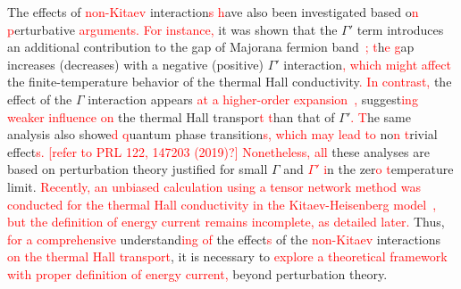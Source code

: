 \documentclass[twocolumn,superscriptaddress,showpacs, longbibliography, aps, prb]{revtex4-2}
\newcommand{\red}[1]{\textcolor{red}{#1}}
\begin{document}
The effects of %
\red{non-Kitaev} interaction\red{s %
h}ave also been investigated based o\red{n %
p}erturbative %
\red{arguments.} %
\red{For instance,} %
it was shown that the $\Gamma'$ term introduces 
an additional contribution to the gap of Majorana fermion band~\cite{TakikawaF2020}\red{; %
t}h\red{e %
g}ap %
increases (decreases)
with a negative (positive) $\Gamma'$ interaction\red{, which might affect} %
the finite-temperature behavior of the thermal Hall conductivity\red{.} %
\red{In contrast,} the 
effect of the $\Gamma$ interaction %
appears %
\red{at a higher-order expansion~\cite{YamadaF2021},}
suggest\red{ing} %
\red{weaker influence on} %
the thermal Hall transpor\red{t %
t}han that of $\Gamma'$\red{. %
T}he same analysis also showe\red{d %
q}uantum phase transition\red{s, %
which may lead to} 
no\red{n%
t}rivial effect\red{s.} %
\red{[refer to PRL 122, 147203 (2019)?]} 
\red{Nonetheless, all} these analyses are based on %
perturbation theory justified for small $\Gamma$ and \red{$\Gamma'$ %
i}n the zer\red{o %
t}emperature limit. 
\red{Recently, an unbiased calculation using a tensor network method was conducted for the thermal Hall conductivity in the Kitaev-Heisenberg model~\cite{KumarT2023}, but the definition of energy current remains incomplete, as detailed later.} 
Thus, %
\red{for a comprehensive} understand\red{ing of} the effect\red{s} of the %
\red{non-Kitaev} interactions %
\red{on the thermal Hall transport}, it is necessary to %
\red{explore a theoretical framework with proper definition of energy current,} beyond %
perturbation theory.
\end{document}
